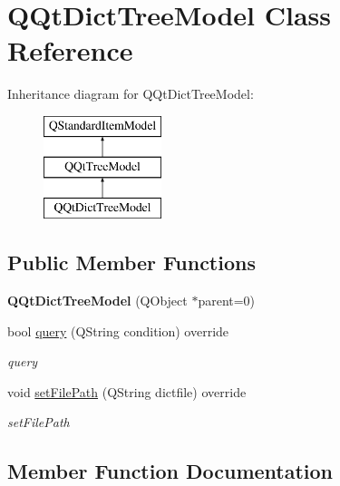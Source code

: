 \hypertarget{class_q_qt_dict_tree_model}{}\section{Q\+Qt\+Dict\+Tree\+Model Class Reference}
\label{class_q_qt_dict_tree_model}
Inheritance diagram for Q\+Qt\+Dict\+Tree\+Model\+:\begin{figure}[H]
\begin{center}
\leavevmode
\includegraphics[height=3.000000cm]{class_q_qt_dict_tree_model}
\end{center}
\end{figure}
\subsection*{Public Member Functions}
\begin{DoxyCompactItemize}
\item 
\mbox{\label{class_q_qt_dict_tree_model_a1b29eb1061396c2888aaa8d2bc50bbab}} 
{\bfseries Q\+Qt\+Dict\+Tree\+Model} (Q\+Object $\ast$parent=0)
\item 
bool \mbox{\hyperlink{class_q_qt_dict_tree_model_ada114e06110a8b69d40fc073ff7fea35}{query}} (Q\+String condition) override
\begin{DoxyCompactList}\small\item\em query \end{DoxyCompactList}\item 
void \mbox{\hyperlink{class_q_qt_dict_tree_model_a5770f3ffdba4901cbc0f521fd930c1c1}{set\+File\+Path}} (Q\+String dictfile) override
\begin{DoxyCompactList}\small\item\em set\+File\+Path \end{DoxyCompactList}\end{DoxyCompactItemize}


\subsection{Member Function Documentation}
\mbox{\label{class_q_qt_dict_tree_model_ada114e06110a8b69d40fc073ff7fea35}} 
